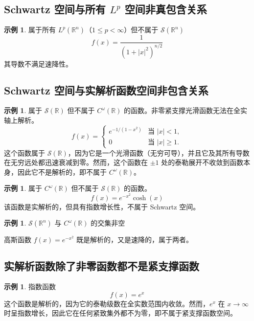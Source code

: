 \documentclass[12pt,a4paper]{article}
\theoremstyle{plain}
\theoremstyle{definition}
\newtheorem{example}[theorem]{示例}
\theoremstyle{remark}
\begin{document}
\subsection{Schwartz 空间与所有 \( L^p \) 空间非真包含关系}
\begin{example}属于所有 \( L^p(\mathbb{R}^n) \)（\(1 \leq p < \infty\)）但不属于 \(\mathcal{S}(\mathbb{R}^n)\)
\[
f(x) = \frac{1}{(1 + |x|^2)^{n/2}}
\]
其导数不满足速降性。
\end{example}

\subsection{Schwartz 空间与实解析函数空间非包含关系}

\begin{example}属于 \(\mathcal{S}(\mathbb{R})\) 但不属于 \(C^\omega(\mathbb{R})\) 的函数。非零紧支撑光滑函数无法在全实轴上解析。
\[
f(x) = \begin{cases} 
	e^{-1/(1 - x^2)} & \text{当 } |x| < 1, \\
	0 & \text{当 } |x| \geq 1.
\end{cases}
\]
这个函数属于 \(\mathcal{S}(\mathbb{R})\)，因为它是一个光滑函数（无穷可导），并且它及其所有导数在无穷远处都迅速衰减到零。然而，这个函数在 \(\pm 1\) 处的泰勒展开不收敛到函数本身，因此它不是解析的，即不属于 \(C^\omega(\mathbb{R})\)。
\end{example}

\begin{example}属于 \(C^\omega(\mathbb{R})\) 但不属于 \(\mathcal{S}(\mathbb{R})\) 的函数。
\[
f(x) = e^{-x^2} \cosh(x)
\]
该函数是实解析的，但具有指数增长性，不属于 Schwartz 空间。

\end{example}


\begin{example}\( \mathcal{S}(\mathbb{R}^n) \) 与 \( C^\omega(\mathbb{R}) \) 的交集非空
	
高斯函数 \( f(x) = e^{-x^2} \) 既是解析的，又是速降的，属于两者。
\end{example}

\subsection{实解析函数除了非零函数都不是紧支撑函数}
\begin{example}指数函数
	\[
	f(x) = e^x
	\]
	这个函数是解析的，因为它的泰勒级数在全实数范围内收敛。然而，\(e^x\) 在 \(x \to \infty\) 时呈指数增长，因此它在任何紧致集外都不为零，即不属于紧支撑函数空间。
\end{example}
\end{document}
